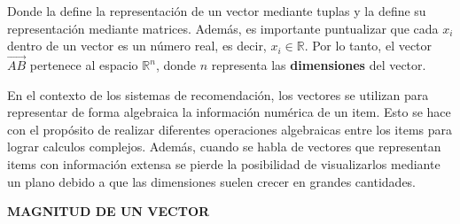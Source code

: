     Donde la  define la representación de un vector mediante tuplas y la  define su representación mediante matrices. Además, es importante puntualizar que cada $x_i$ dentro de un vector es un número real, es decir,  $x_i \in \mathbb{R}$. Por lo tanto, el vector $\vec{AB}$ pertenece al espacio $\mathbb{R}^n$, donde $n$ representa las \textbf{dimensiones} del vector.

    En el contexto de los sistemas de recomendación, los vectores se utilizan para representar de forma algebraica la información numérica de un item. Esto se hace con el propósito de realizar diferentes operaciones algebraicas entre los items para lograr calculos complejos. Además, cuando se habla de vectores que representan items con información extensa se pierde la posibilidad de visualizarlos mediante un plano debido a que las dimensiones suelen crecer en grandes cantidades.

    \newpage

    \textbf{MAGNITUD DE UN VECTOR}







    